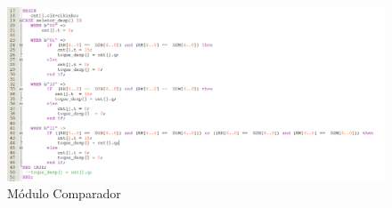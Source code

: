 \documentclass[14pt, oneside]{book}
\theoremstyle{definition}
\begin{document}
                
                \begin{figure}[H]
                    \centering                    
                    \includegraphics[scale = 0.62]{comparador.PNG}
                    \caption{Módulo Comparador}
                    \label{manual}
                \end{figure} \\
\end{document}
